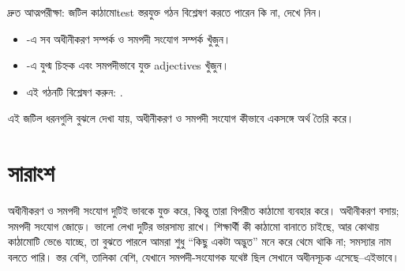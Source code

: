 \begin{tblsframedsymbol}{দ্রুত আত্মপরীক্ষা: জটিল কাঠামো}{test}
স্তরযুক্ত গঠন বিশ্লেষণ করতে পারেন কি না, দেখে নিন।
\begin{itemize}[noitemsep, leftmargin=*]
    \item {}-এ সব অধীনীকরণ সম্পর্ক ও সমপদী সংযোগ সম্পর্ক খুঁজুন।
    \item {}-এ যুগ্ম চিহ্নক এবং সমপদীভাবে যুক্ত adjectives খুঁজুন।
    \item এই গঠনটি বিশ্লেষণ করুন: .
\end{itemize}
এই জটিল ধরনগুলি বুঝলে দেখা যায়, অধীনীকরণ ও সমপদী সংযোগ কীভাবে একসঙ্গে অর্থ তৈরি করে।
\end{tblsframedsymbol}

\section{সারাংশ}

অধীনীকরণ ও সমপদী সংযোগ দুটিই ভাবকে যুক্ত করে, কিন্তু তারা বিপরীত কাঠামো ব্যবহার করে। অধীনীকরণ বসায়; সমপদী সংযোগ জোড়ে। ভালো লেখা দুটির ভারসাম্য রাখে। শিক্ষার্থী কী কাঠামো বানাতে চাইছে, আর কোথায় কাঠামোটি ভেঙে যাচ্ছে, তা বুঝতে পারলে আমরা শুধু \enquote{কিছু একটা অদ্ভুত} মনে করে থেমে থাকি না; সমস্যার নাম বলতে পারি। স্তর বেশি, তালিকা বেশি, যেখানে সমপদী-সংযোগক যথেষ্ট ছিল সেখানে অধীনসূচক এসেছে--এইভাবে।
